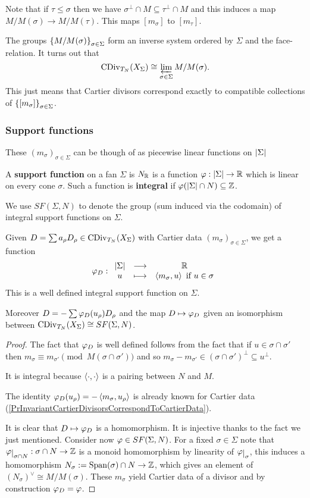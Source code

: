 Note that if $\tau\leq \sigma$ then we have $\sigma^\perp\cap M\subseteq \tau^\perp\cap M$ and this induces a map $M/M(\sigma)\to M/M(\tau)$. This maps $[m_\sigma]$ to $[m_\tau]$.

The groups $\left\{{M/M(\sigma)}\right\}_{\sigma\in \Sigma}$ form an inverse system ordered by $\Sigma$ and the face-relation. It turns out that
\[\operatorname{CDiv}_{T_N}(X_\Sigma)\cong \varprojlim_{\sigma\in \Sigma}M/M(\sigma).\]
This just means that Cartier divisors correspond exactly to compatible collections of $\left\{{[m_\sigma]}\right\}_{\sigma\in \Sigma}$.


\subsubsection{Support functions}
These $(m_\sigma)_{\sigma\in\Sigma}$ can be though of as piecewise linear functions on $\left|{\Sigma}\right|$

\begin{definition}[]
A \textbf{support function} on a fan $\Sigma$ is $N_{\mathbb{R}}$ is a function $\varphi:\left|{\Sigma}\right|\to \mathbb{R}$ which is linear on every cone $\sigma$. Such a function is \textbf{integral} if $\varphi(\left|{\Sigma}\right|\cap N)\subseteq \mathbb{Z}$.


We use $SF(\Sigma,N)$ to denote the group (sum induced via the codomain) of integral support functions on $\Sigma$.
\end{definition}

\begin{theorem}[]\label{ThIntegralSupportFunctionCorrespondToInvariantCartierDivisors}
Given $D=\sum a_\rho D_\rho\in \operatorname{CDiv}_{T_N}(X_\Sigma)$ with Cartier data $(m_\sigma)_{\sigma\in \Sigma}$, we get a function
\[\varphi_D:\begin{array}{ccc} {\left|{\Sigma}\right|} & \longrightarrow & {\mathbb{R}}\\ {u} & \longmapsto & {\left\langle {m_\sigma,u}\right\rangle\text{ if }u\in \sigma} \end{array}\]
This is a well defined integral support function on $\Sigma$.

Moreover $D=-\sum \varphi_D(u_\rho)D_\rho$ and the map $D\mapsto \varphi_D$ given an isomorphism between $\operatorname{CDiv}_{T_N}(X_\Sigma)\cong SF(\Sigma,N)$.
\end{theorem}
\begin{proof}
The fact that $\varphi_D$ is well defined follows from the fact that if $u\in \sigma\cap \sigma'$ then $m_\sigma\equiv m_{\sigma'}\pmod{M(\sigma\cap \sigma')}$ and so $m_\sigma-m_{\sigma'}\in (\sigma\cap \sigma')^\perp\subseteq u^\perp$.

It is integral because $\left\langle {\cdot,\cdot}\right\rangle$ is a pairing between $N$ and $M$.

The identity $\varphi_D(u_\rho)=-\left\langle {m_\sigma,u_\rho}\right\rangle$ is already known for Cartier data (\ref{PrInvariantCartierDivisorsCorrespondToCartierData}).

It is clear that $D\mapsto \varphi_D$ is a homomorphism. It is injective thanks to the fact we just mentioned. Consider now $\varphi\in SF(\Sigma,N)$. For a fixed $\sigma\in \Sigma$ note that $\vp\res{\sigma\cap N}:\sigma\cap N\to \Z$ is a monoid homomorphism by linearity of $\vp\res\sigma$, this induces a homomorphism $N_\sigma:=\operatorname{Span}(\sigma)\cap N\to \mathbb{Z}$, which gives an element of $(N_\sigma)^\vee\cong M/M(\sigma)$. These $m_\sigma$ yield Cartier data of a divisor and by construction $\varphi_D=\varphi$.
\end{proof}



